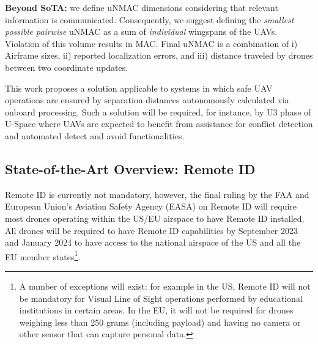 \documentclass[10pt,conference]{IEEEtran}
\begin{document}
\textbf{Beyond SoTA:} we define uNMAC dimensions considering that relevant information is communicated.
Consequently, we suggest defining the \textit{smallest possible pairwise} uNMAC as a sum of \textit{individual} wingspans of the UAVs. Violation of this volume results in MAC. Final uNMAC is a combination of i) Airframe sizes, ii) reported localization errors, and iii) distance traveled by drones between two coordinate updates.

This work proposes a solution applicable to systems in which safe UAV operations are ensured by separation distances autonomously calculated via onboard processing. Such a solution will be required, for instance, by U3 phase of U-Space where UAVs are expected to benefit from assistance for conflict detection and automated detect and avoid functionalities.%


\subsection{State-of-the-Art Overview: Remote ID}
Remote ID is currently not mandatory, however, the final ruling by the FAA and European Union’s Aviation Safety Agency (EASA) on Remote ID will require most drones operating within the US/EU airspace to have Remote ID installed. All drones will be required to have Remote ID capabilities by September 2023 and January 2024 to have access to the national airspace of the US and all the EU member states\footnote{A number of exceptions will exist: for example in the US, Remote ID will not be mandatory for Visual Line of Sight operations performed by educational institutions in certain areas. In the EU, it will not be required for drones weighing less than 250 grams (including payload) and having no camera or other sensor that can capture personal data.}.
\end{document}
